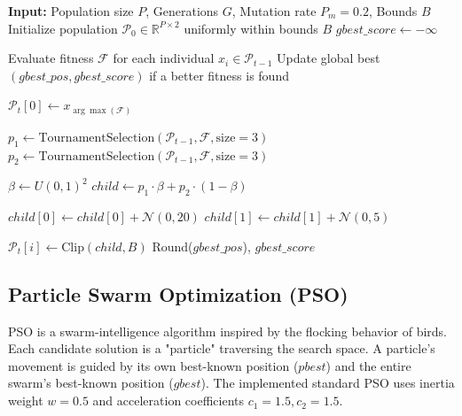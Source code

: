 \documentclass[12pt, a4paper]{article}
\begin{document}
\begin{algorithm}[H]
\caption{Genetic Algorithm for Hyperparameter Tuning}
\begin{algorithmic}[1]
\State \textbf{Input:} Population size $P$, Generations $G$, Mutation rate $P_m = 0.2$, Bounds $B$
\State Initialize population $\mathcal{P}_{0} \in \mathbb{R}^{P \times 2}$ uniformly within bounds $B$
\State $gbest\_score \leftarrow -\infty$

    \State Evaluate fitness $\mathcal{F}$ for each individual $x_i \in \mathcal{P}_{t-1}$
    \State Update global best $(gbest\_pos, gbest\_score)$ if a better fitness is found
    
    \State $\mathcal{P}_{t}[0] \leftarrow x_{\arg\max(\mathcal{F})}$ 
    
        \State $p_1 \leftarrow \text{TournamentSelection}(\mathcal{P}_{t-1}, \mathcal{F}, \text{size}=3)$
        \State $p_2 \leftarrow \text{TournamentSelection}(\mathcal{P}_{t-1}, \mathcal{F}, \text{size}=3)$
        
        \State $\beta \leftarrow U(0, 1)^{2}$ 
        \State $child \leftarrow p_1 \cdot \beta + p_2 \cdot (1 - \beta)$
        
         
            \State $child[0] \leftarrow child[0] + \mathcal{N}(0, 20)$
            \State $child[1] \leftarrow child[1] + \mathcal{N}(0, 5)$
        \EndIf
        
        \State $\mathcal{P}_{t}[i] \leftarrow \text{Clip}(child, B)$
    \EndFor
\EndFor
\State \Return Round($gbest\_pos$), $gbest\_score$
\end{algorithmic}
\end{algorithm}

\subsection{Particle Swarm Optimization (PSO)}
PSO is a swarm-intelligence algorithm inspired by the flocking behavior of birds. Each candidate solution is a "particle" traversing the search space. A particle's movement is guided by its own best-known position ($pbest$) and the entire swarm's best-known position ($gbest$). The implemented standard PSO uses inertia weight $w=0.5$ and acceleration coefficients $c_1=1.5, c_2=1.5$.
\end{document}
